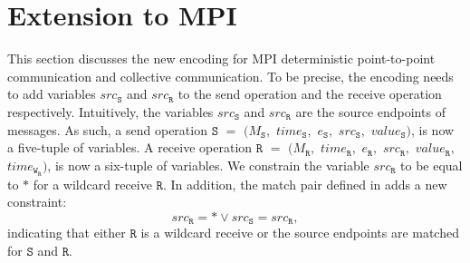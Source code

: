\section{Extension to MPI}
This section discusses the new encoding for MPI deterministic point-to-point communication and collective communication. To be precise, the encoding needs to add variables  $src_\mathtt{S}$ and $src_\mathtt{R}$ to the send operation and the receive operation respectively. Intuitively, the variables $src_\mathtt{S}$ and $src_\mathtt{R}$ are the source endpoints of messages. As such, a send operation $\mathtt{S}$ $=$ $(M_\mathtt{S},$ $\mathit{time}_\mathtt{S},$ $e_\mathtt{S},$ $src_\mathtt{S},$ $\mathit{value}_\mathtt{S})$,  is now a five-tuple of variables. A receive operation $\mathtt{R}$ $=$ $(M_\mathtt{R},$ $\mathit{time}_\mathtt{R},$ $e_\mathtt{R},$ $src_\mathtt{R},$ $\mathit{value}_\mathtt{R},$ $\mathit{time}_{\mathtt{W}_\mathtt{R}})$, is now a six-tuple of variables. We constrain the variable $src_\mathtt{R}$ to be equal to $\ast$ for a wildcard receive $\mathtt{R}$. In addition, the match pair defined in  adds a new constraint: 
\[
src_\mathtt{R} = \ast \vee src_\mathtt{S} = src_\mathtt{R}, 
\]
indicating that either $\mathtt{R}$ is a wildcard receive or the source endpoints are matched for $\mathtt{S}$ and $\mathtt{R}$.
\\